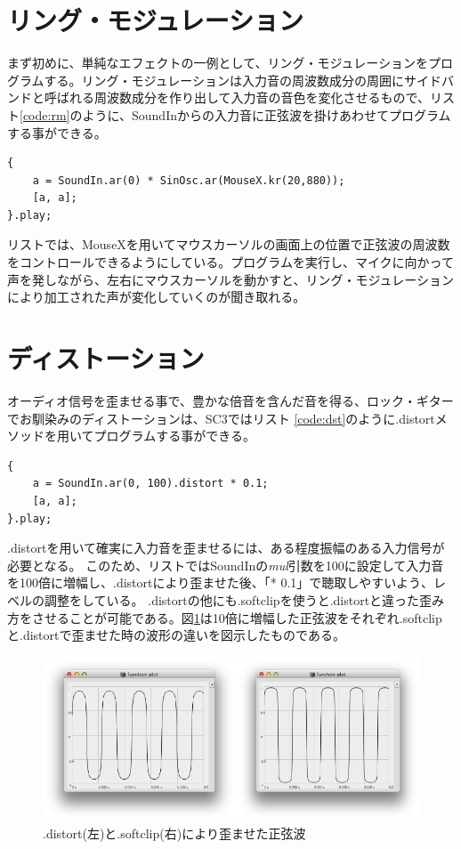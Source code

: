 \documentclass{jsarticle}
\begin{document}
\section{リング・モジュレーション}
まず初めに、単純なエフェクトの一例として、リング・モジュレーションをプログラムする。リング・モジュレーションは入力音の周波数成分の周囲にサイドバンドと呼ばれる周波数成分を作り出して入力音の音色を変化させるもので、リスト\ref{code:rm}のように、SoundInからの入力音に正弦波を掛けあわせてプログラムする事ができる。

\begin{lstlisting}[caption=リング・モジュレーション,label=code:rm]
{
	a = SoundIn.ar(0) * SinOsc.ar(MouseX.kr(20,880));
	[a, a];
}.play;
\end{lstlisting}

リストでは、MouseXを用いてマウスカーソルの画面上の位置で正弦波の周波数をコントロールできるようにしている。プログラムを実行し、マイクに向かって声を発しながら、左右にマウスカーソルを動かすと、リング・モジュレーションにより加工された声が変化していくのが聞き取れる。

\section{ディストーション}
オーディオ信号を歪ませる事で、豊かな倍音を含んだ音を得る、ロック・ギターでお馴染みのディストーションは、SC3ではリスト
\ref{code:dst}のように.distortメソッドを用いてプログラムする事ができる。

\begin{lstlisting}[caption=ディストーション, label=code:dst]
{
	a = SoundIn.ar(0, 100).distort * 0.1;
	[a, a];
}.play;
\end{lstlisting}

.distortを用いて確実に入力音を歪ませるには、ある程度振幅のある入力信号が必要となる。
このため、リストではSoundInの{\it mul}引数を100に設定して入力音を100倍に増幅し、.distortにより歪ませた後、「* 0.1」で聴取しやすいよう、レベルの調整をしている。
.distortの他にも.softclipを使うと.distortと違った歪み方をさせることが可能である。図\ref{fig:comparison}は10倍に増幅した正弦波をそれぞれ.softclipと.distortで歪ませた時の波形の違いを図示したものである。

\begin{figure}[htbp]
	\begin{center}
		\includegraphics[scale=0.6]{comparison.pdf}
	\end{center}
	\caption{.distort(左)と.softclip(右)により歪ませた正弦波}
	\label{fig:comparison}
\end{figure}
\end{document}
